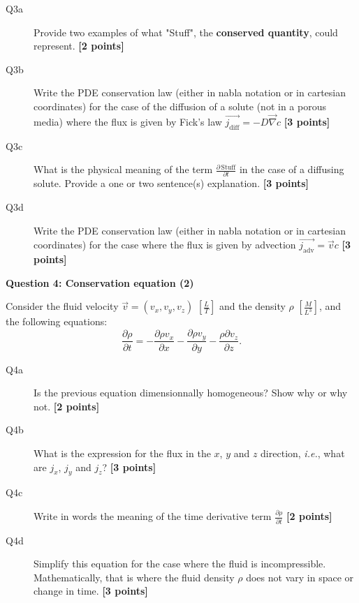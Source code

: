 \documentclass{article}
\begin{document}
\begin{description}
\item [Q3a] Provide two examples of what "Stuff", the \textbf{conserved quantity}, could represent. \textbf{[2 points]}
\vspace{2cm}

\item [Q3b] Write the PDE conservation law (either in nabla notation or in cartesian coordinates) for the case of the diffusion of a solute (not in a porous media) where the flux is given by Fick's law $ \overrightarrow{j_{\mathrm{diff}}} = - D \overrightarrow{\nabla} c$ \textbf{[3 points]}
\vspace{2cm}


\item [Q3c] What is the physical meaning of the term $\frac{\partial \, \mathrm{Stuff}}{\partial t}$ in the case of a diffusing solute. Provide a one or two sentence(s) explanation. \textbf{[3 points]}
\vspace{2cm}

\item [Q3d] Write the PDE conservation law (either in nabla notation or in cartesian coordinates) for the case where the flux is given by advection $ \overrightarrow{j_{\mathrm{adv}}} = \overrightarrow{v} c$ \textbf{[3 points]}
\vspace{2cm}

\end{description}

\textbf{Question 4: Conservation equation (2)}

Consider the fluid velocity $ \overrightarrow{v} = \left(v_x,v_y,v_z   \right)$ $\left[\frac{L}{T}\right]$ and the density $\rho$ $\left[\frac{M}{L^3}\right]$, and the following equations:
\begin{equation}
\frac{\partial \rho}{\partial t} = - \frac{\partial \rho v_x}{\partial x} - \frac{\partial \rho v_y}{\partial y} - \frac{\rho \partial v_z}{\partial z}.
\end{equation}



\begin{description}
\item [Q4a] Is the previous equation dimensionnally homogeneous? Show why or why not. \textbf{[2 points]}
\vspace{2cm}
\item [Q4b] What is the expression for the flux in the $x$, $y$ and $z$ direction, \textit{i.e.}, what are $j_x$, $j_y$ and $j_z$? \textbf{[3 points]}
\vspace{2cm}
\item [Q4c] Write in words the meaning of the time derivative term $\frac{\partial \rho}{\partial t}$ \textbf{[2 points]}
\vspace{2cm}
\item [Q4d] Simplify this equation for the case where the fluid is incompressible. Mathematically, that is where the fluid density $\rho$ does not vary in space or change in time. \textbf{[3 points]}
\vspace{2cm}
\end{description}
\end{document}
